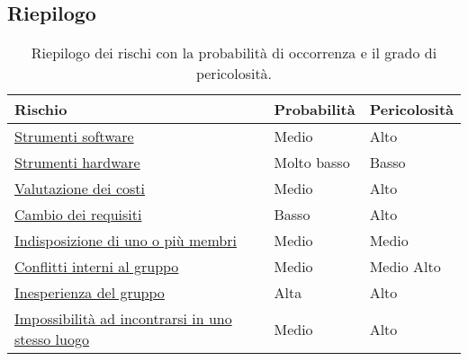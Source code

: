 \subsection{Riepilogo}
{\renewcommand\arraystretch{1.2} 
\begin{table}[h]
\begin{tabular}{|l|l|l|}
\hline
\textbf{Rischio} & \textbf{Probabilità} & \textbf{Pericolosità} \\
\hline
 \hyperlink{subsubsect:software}{Strumenti software} & Medio & Alto \\
\hline
\hyperlink{subsubsect:hardware}{Strumenti hardware} & Molto basso & Basso\\
\hline
\hyperlink{subsubsect:costi}{Valutazione dei costi} & Medio & Alto \\
\hline
\hyperlink{subsubsect:requisiti}{Cambio dei requisiti} & Basso & Alto \\
\hline
\hyperlink{subsubsect:indisposizione}{Indisposizione di uno o più membri} & Medio & Medio \\
\hline
\hyperlink{subsubsect:conflitti}{Conflitti interni al gruppo} & Medio & Medio Alto \\
\hline
\hyperlink{subsubsect:inesperienza}{Inesperienza del gruppo} & Alta & Alto \\
\hline
\hyperlink{subsubsect:incontri}{Impossibilità ad incontrarsi in uno stesso luogo} & Medio & Alto \\
\hline
\end{tabular}
\caption{Riepilogo dei rischi con la probabilità di occorrenza e il grado di pericolosità.}
\end{table}}


\newpage